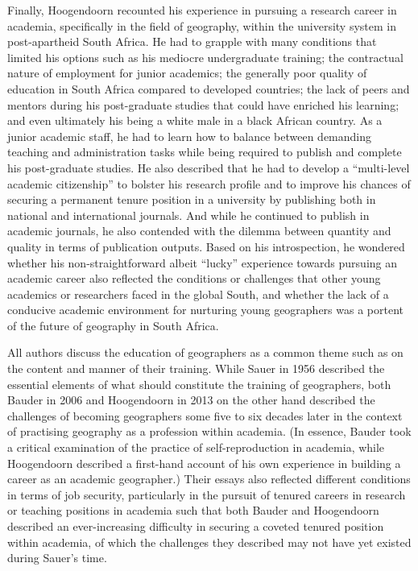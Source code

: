 \documentclass[a4paper, 10.5pt]{article} %
\begin{document}
Finally, Hoogendoorn recounted his experience in pursuing a research career in academia, specifically in the field of geography, within the university system in post-apartheid South Africa. He had to grapple with many conditions that limited his options such as his mediocre undergraduate training; the contractual nature of employment for junior academics; the generally poor quality of education in South Africa compared to developed countries; the lack of peers and mentors during his post-graduate studies that could have enriched his learning; and even ultimately his being a white male in a black African country. As a junior academic staff, he had to learn how to balance between demanding teaching and administration tasks while being required to publish and complete his post-graduate studies. He also described that he had to develop a \enquote{multi-level academic citizenship} to bolster his research profile and to improve his chances of securing a permanent tenure position in a university by publishing both in national and international journals. And while he continued to publish in academic journals, he also contended with the dilemma between quantity and quality in terms of publication outputs. Based on his introspection, he wondered whether his non-straightforward albeit \enquote{lucky} experience towards pursuing an academic career also reflected the conditions or challenges that other young academics or researchers faced in the global South, and whether the lack of a conducive academic environment for nurturing young geographers was a portent of the future of geography in South Africa.

All authors discuss the education of geographers as a common theme such as on the content and manner of their training. While Sauer in 1956 described the essential elements of what should constitute the training of geographers, both Bauder in 2006 and Hoogendoorn in 2013 on the other hand described the challenges of becoming geographers some five to six decades later in the context of practising geography as a profession within academia. (In essence, Bauder took a critical examination of the practice of self-reproduction in academia, while Hoogendoorn described a first-hand account of his own experience in building a career as an academic geographer.) Their essays also reflected different conditions in terms of job security, particularly in the pursuit of tenured careers in research or teaching positions in academia such that both Bauder and Hoogendoorn described an ever-increasing difficulty in securing a coveted tenured position within academia, of which the challenges they described may not have yet existed during Sauer's time.





\end{document}

